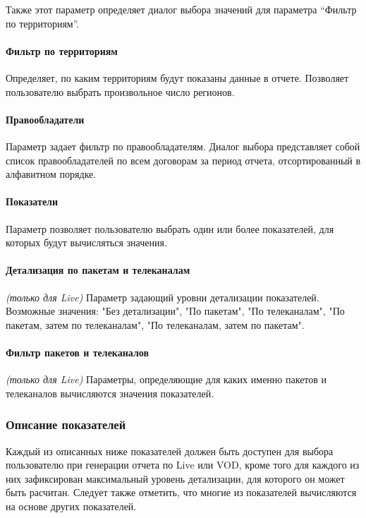 Также этот параметр определяет диалог выбора значений для параметра “Фильтр по территориям”.

\paragraph{Фильтр по территориям} Определяет, по каким территориям будут показаны данные в отчете. 
Позволяет пользователю выбрать произвольное число регионов.

\paragraph{Правообладатели} Параметр задает фильтр по правообладателям. 
Диалог выбора представляет собой список правообладателей по всем договорам за период отчета, отсортированный в алфавитном порядке.

\paragraph{Показатели} Параметр позволяет пользователю выбрать один или более показателей, для которых будут вычисляться значения.

\paragraph{Детализация по пакетам и телеканалам} \textit{(только для Live)}
Параметр задающий уровни детализации показателей. Возможные значения:
"Без детализации", "По пакетам", "По телеканалам", "По пакетам, затем по телеканалам",
"По телеканалам, затем по пакетам".

\paragraph{Фильтр пакетов и телеканалов} \textit{(только для Live)} Параметры, определяющие для каких именно пакетов
и телеканалов вычисляются значения показателей.

\subsubsection{Описание показателей}
Каждый из описанных ниже показателей должен быть доступен для выбора пользователю при генерации
отчета по Live или VOD, кроме того для каждого из них зафиксирован максимальный уровень детализации,
для которого он может быть расчитан. Следует также отметить, что многие из показателей вычисляются
на основе других показателей.

